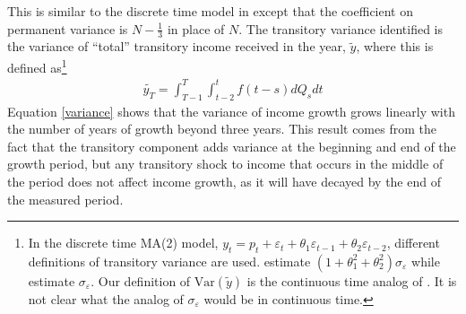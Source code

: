 \documentclass[titlepage]{\econtex}\newcommand{\texname}{ConsumptionHeterogeneity}
\begin{document}
	This is similar to the discrete time model in \cite{carroll_nature_1997} except that the coefficient on permanent variance is $N-\frac{1}{3}$ in place of $N$. The transitory variance identified is the variance of ``total'' transitory income received in the year, $\tilde{y}$, where this is defined as\footnote{In the discrete time MA(2) model, $y_t = p_t + \varepsilon_t + \theta_1 \varepsilon_{t-1} + \theta_2 \varepsilon_{t-2}$, different definitions of transitory variance are used. \cite{carroll_nature_1997} estimate $(1+\theta_1^2 + \theta_2^2)\sigma_{\varepsilon}$ while \cite{blundell_consumption_2008} estimate $\sigma_{\varepsilon}$. Our definition of $\mathrm{Var}(\tilde{y})$ is the continuous time analog of \cite{carroll_nature_1997}. It is not clear what the analog of $\sigma_{\varepsilon}$ would be in continuous time.}
	\begin{align}
	\tilde{y_T} = \int_{T-1}^{T}\int_{t-2}^{t} f(t-s)dQ_s dt \label{tot_income}
	\end{align}
	Equation \ref{variance} shows that the variance of income growth grows linearly with the number of years of growth beyond three years. This result comes from the fact that the transitory component adds variance at the beginning and end of the growth period, but any transitory shock to income that occurs in the middle of the period does not affect income growth, as it will have decayed by the end of the measured period.
	
\end{document}
